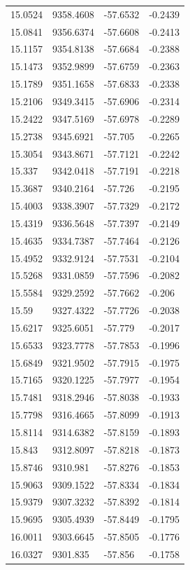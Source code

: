 \begin{table}[H]
\begin{tabular}{llll}
15.0524 & 9358.4608 & -57.6532 & -0.2439 \\
15.0841 & 9356.6374 & -57.6608 & -0.2413 \\
15.1157 & 9354.8138 & -57.6684 & -0.2388 \\
15.1473 & 9352.9899 & -57.6759 & -0.2363 \\
15.1789 & 9351.1658 & -57.6833 & -0.2338 \\
15.2106 & 9349.3415 & -57.6906 & -0.2314 \\
15.2422 & 9347.5169 & -57.6978 & -0.2289 \\
15.2738 & 9345.6921 & -57.705 & -0.2265 \\
15.3054 & 9343.8671 & -57.7121 & -0.2242 \\
15.337 & 9342.0418 & -57.7191 & -0.2218 \\
15.3687 & 9340.2164 & -57.726 & -0.2195 \\
15.4003 & 9338.3907 & -57.7329 & -0.2172 \\
15.4319 & 9336.5648 & -57.7397 & -0.2149 \\
15.4635 & 9334.7387 & -57.7464 & -0.2126 \\
15.4952 & 9332.9124 & -57.7531 & -0.2104 \\
15.5268 & 9331.0859 & -57.7596 & -0.2082 \\
15.5584 & 9329.2592 & -57.7662 & -0.206 \\
15.59 & 9327.4322 & -57.7726 & -0.2038 \\
15.6217 & 9325.6051 & -57.779 & -0.2017 \\
15.6533 & 9323.7778 & -57.7853 & -0.1996 \\
15.6849 & 9321.9502 & -57.7915 & -0.1975 \\
15.7165 & 9320.1225 & -57.7977 & -0.1954 \\
15.7481 & 9318.2946 & -57.8038 & -0.1933 \\
15.7798 & 9316.4665 & -57.8099 & -0.1913 \\
15.8114 & 9314.6382 & -57.8159 & -0.1893 \\
15.843 & 9312.8097 & -57.8218 & -0.1873 \\
15.8746 & 9310.981 & -57.8276 & -0.1853 \\
15.9063 & 9309.1522 & -57.8334 & -0.1834 \\
15.9379 & 9307.3232 & -57.8392 & -0.1814 \\
15.9695 & 9305.4939 & -57.8449 & -0.1795 \\
16.0011 & 9303.6645 & -57.8505 & -0.1776 \\
16.0327 & 9301.835 & -57.856 & -0.1758 \\

\end{tabular}
\end{table}
